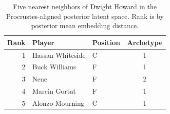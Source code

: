 \begin{table}[htbp]
  \centering\small
  \begin{tabular}{rllc}
    \toprule
    Rank & Player & Position & Archetype \\
    \midrule
    1 & Hassan Whiteside & C & 1 \\
    2 & Buck Williams & F & 1 \\
    3 & Nene & F & 2 \\
    4 & Marcin Gortat & F & 1 \\
    5 & Alonzo Mourning & C & 1 \\
    \bottomrule
  \end{tabular}
  \caption{Five nearest neighbors of Dwight Howard in the Procrustes-aligned posterior latent space. Rank is by posterior mean embedding distance.}
  \label{tab:Dwight_Howard_neighbors}
\end{table}

